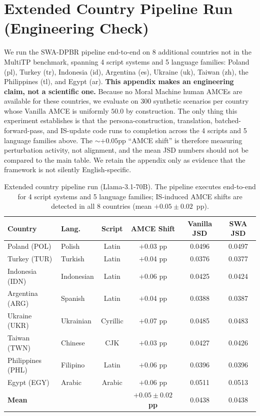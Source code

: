 \documentclass{article}
\begin{document}
\section{Extended Country Pipeline Run (Engineering Check)}
\label{app:extended}

We run the SWA-DPBR pipeline end-to-end on 8 additional countries not in the
MultiTP benchmark, spanning 4 script systems and 5 language families: Poland
(pl), Turkey (tr), Indonesia (id), Argentina (es), Ukraine (uk), Taiwan (zh),
the Philippines (tl), and Egypt (ar). \textbf{This appendix makes an
engineering claim, not a scientific one.} Because no Moral Machine human
AMCEs are available for these countries, we evaluate on 300 synthetic
scenarios per country whose Vanilla AMCE is uniformly $50.0$ by construction.
The only thing this experiment establishes is that the persona-construction,
translation, batched-forward-pass, and IS-update code
runs to completion across the 4 scripts and 5 language families above. The
$\sim$$+0.05$pp ``AMCE shift'' is therefore measuring perturbation activity,
not alignment, and the mean JSD numbers should not be compared to the main
table. We retain the appendix only as evidence that the framework is not
silently English-specific.

\begin{table}[h]\centering\small
\caption{Extended country pipeline run (Llama-3.1-70B). The pipeline executes
end-to-end for 4 script systems and 5 language families; IS-induced AMCE shifts
are detected in all 8 countries (mean $+0.05\pm0.02$~pp).}
\label{tab:extended_countries}
\begin{tabular}{llcccc}\toprule
Country & Lang. & Script & AMCE Shift & Vanilla JSD & SWA JSD \\\midrule
Poland (POL)      & Polish    & Latin    & $+$0.03 pp & 0.0496 & 0.0497 \\
Turkey (TUR)      & Turkish   & Latin    & $+$0.04 pp & 0.0376 & 0.0377 \\
Indonesia (IDN)   & Indonesian& Latin    & $+$0.06 pp & 0.0425 & 0.0424 \\
Argentina (ARG)   & Spanish   & Latin    & $+$0.04 pp & 0.0388 & 0.0387 \\
Ukraine (UKR)     & Ukrainian & Cyrillic & $+$0.07 pp & 0.0485 & 0.0483 \\
Taiwan (TWN)      & Chinese   & CJK      & $+$0.03 pp & 0.0427 & 0.0426 \\
Philippines (PHL) & Filipino  & Latin    & $+$0.06 pp & 0.0396 & 0.0396 \\
Egypt (EGY)       & Arabic    & Arabic   & $+$0.06 pp & 0.0511 & 0.0513 \\\midrule
\textbf{Mean} & & & $\mathbf{+0.05\pm0.02}$ \textbf{pp} & 0.0438 & 0.0438 \\\bottomrule
\end{tabular}
\end{table}
\end{document}
